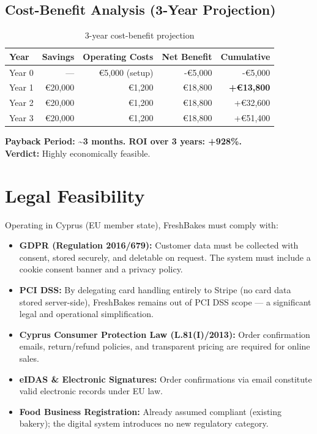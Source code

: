 \documentclass[12pt, a4paper]{report}
\begin{document}
\subsection*{Cost-Benefit Analysis (3-Year Projection)}

\begin{table}[H]
  \centering
  \begin{tabularx}{\textwidth}{L{1.5cm} r r r r}
    \toprule
    \textbf{Year} & \textbf{Savings} & \textbf{Operating Costs} & \textbf{Net Benefit} & \textbf{Cumulative} \\
    \midrule
    Year 0 & ---        & \euro{}5,000 (setup) & -\euro{}5,000  & -\euro{}5,000  \\
    Year 1 & \euro{}20,000 & \euro{}1,200      & \euro{}18,800  & \textbf{+\euro{}13,800} \\
    Year 2 & \euro{}20,000 & \euro{}1,200      & \euro{}18,800  & +\euro{}32,600 \\
    Year 3 & \euro{}20,000 & \euro{}1,200      & \euro{}18,800  & +\euro{}51,400 \\
    \bottomrule
  \end{tabularx}
  \caption{3-year cost-benefit projection}
\end{table}

\begin{verdictbox}
\textbf{Payback Period: \textasciitilde3 months. ROI over 3 years: +928\%.}\\
\textbf{Verdict:} Highly economically feasible.
\end{verdictbox}

\section{Legal Feasibility}

Operating in Cyprus (EU member state), FreshBakes must comply with:

\begin{itemize}[noitemsep]
  \item \textbf{GDPR (Regulation 2016/679):} Customer data must be collected
        with consent, stored securely, and deletable on request. The system
        must include a cookie consent banner and a privacy policy.
  \item \textbf{PCI DSS:} By delegating card handling entirely to Stripe
        (no card data stored server-side), FreshBakes remains out of PCI DSS
        scope --- a significant legal and operational simplification.
  \item \textbf{Cyprus Consumer Protection Law (L.81(I)/2013):} Order
        confirmation emails, return/refund policies, and transparent pricing
        are required for online sales.
  \item \textbf{eIDAS \& Electronic Signatures:} Order confirmations via
        email constitute valid electronic records under EU law.
  \item \textbf{Food Business Registration:} Already assumed compliant
        (existing bakery); the digital system introduces no new regulatory
        category.
\end{itemize}
\end{document}
